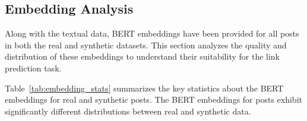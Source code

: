 



\subsection*{Embedding Analysis}

Along with the textual data, BERT embeddings have been provided for all posts in both the real and synthetic datasets. This section analyzes the quality and distribution of these embeddings to understand their suitability for the link prediction task.

Table~\ref{tab:embedding_stats} summarizes the key statistics about the BERT embeddings for real and synthetic posts. The BERT embeddings for posts exhibit significantly different distributions between real and synthetic data.

